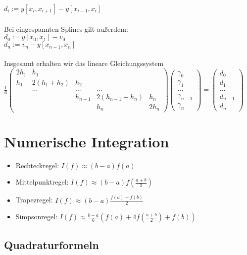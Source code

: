 \documentclass[a4paper]{scrreprt}
\begin{document}
$d_i := y[x_i,x_{i+1}]-y[x_{i-1},x_i]$\\\\
Bei eingespannten Splines gilt außerdem:\\
$d_0 := y[x_0,x_1] - v_0$\\
$d_n := v_n - y[x_{n-1},x_n]$\\\\

Insgesamt erhalten wir das lineare Gleichungssystem\\
$\frac{1}{6}\begin{pmatrix}
2h_1 & h_1\\
h_1 & 2(h_1 + h_2) & h_2\\
    & ... & ... & ...\\
& & h_{n-1} & 2(h_{n-1}+h_n) & h_n\\
& & & h_n & 2h_n
\end{pmatrix}
\begin{pmatrix}\gamma_0\\\gamma_1\\...\\\gamma_{n-1}\\\gamma_n\end{pmatrix}=
\begin{pmatrix}d_0\\d_1\\...\\d_{n-1}\\d_n\end{pmatrix}$

\chapter{Numerische Integration}

\begin{itemize}
	\item Rechteckregel: $I(f) \approx (b-a)f(a)$
	\item Mittelpunktregel: $I(f) \approx (b-a)f(\frac{a+b}{2})$
	\item Trapezregel: $I(f) \approx (b-a)\frac{f(a) + f(b)}{2}$
	\item Simpsonregel: $I(f) \approx \frac{b-a}{6}(f(a) + 4f(\frac{a+b}{2})+f(b))$
\end{itemize}

\section{Quadraturformeln}
\end{document}

